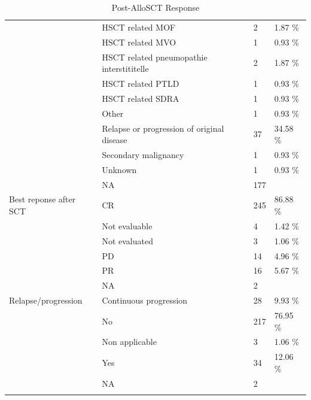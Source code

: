 \documentclass[a4paper,11pt] {article}
\begin{document}
\begin{longtable}{llll}
   & HSCT related MOF & 2 & 1.87 \% \\ 
   & HSCT related MVO & 1 & 0.93 \% \\ 
   & HSCT related pneumopathie interstititelle & 2 & 1.87 \% \\ 
   & HSCT related PTLD & 1 & 0.93 \% \\ 
   & HSCT related SDRA & 1 & 0.93 \% \\ 
   & Other & 1 & 0.93 \% \\ 
   & Relapse or progression of original disease & 37 & 34.58 \% \\ 
   & Secondary malignancy & 1 & 0.93 \% \\ 
   & Unknown & 1 & 0.93 \% \\ 
   & NA & 177 &  \\ 
  Best reponse after SCT & CR & 245 & 86.88 \% \\ 
   & Not evaluable & 4 & 1.42 \% \\ 
   & Not evaluated & 3 & 1.06 \% \\ 
   & PD & 14 & 4.96 \% \\ 
   & PR & 16 & 5.67 \% \\ 
   & NA & 2 &  \\ 
  Relapse/progression & Continuous progression & 28 & 9.93 \% \\ 
   & No & 217 & 76.95 \% \\ 
   & Non applicable  & 3 & 1.06 \% \\ 
   & Yes & 34 & 12.06 \% \\ 
   & NA & 2 &  \\ 
   \hline
\hline
\caption{Post-AlloSCT Response} 
\label{tab:pg}
\end{longtable}


\pagebreak[4]
\begin{landscape}





\end{landscape}

\restoregeometry
\end{document}
